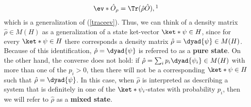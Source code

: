 \documentclass[12pt]{report}
\begin{document}
    \begin{equation}\label{expdensity}\ev*{\hat{O}}_\rho=\Tr(\hat{\rho}\hat{O}),\protect\footnotemark\end{equation}which is a generalization of (\ref{traceev}). Thus, we can think of a density matrix $\hat{\rho}\in M(H)$ as a generalization \label{genket} of a state ket-vector $\ket*{\psi}\in H$, since for every $\ket*{\psi}\in H$ there corresponds a density matrix $\hat{\rho}=\dyad{\psi}\in M(H)$. Because of this identification, $\hat{\rho}=\dyad{\psi}$ is referred to as a \textbf{pure state}. On the other hand, the converse does not hold: if $\hat{\rho}=\sum_i p_i\dyad{\psi_i}\in M(H)$ with more than one of the $p_i> 0$, then there will not be a corresponding $\ket*{\psi}\in H$ such that $\hat{\rho}=\dyad{\psi}$. In this case, when $\hat{\rho}$ is interpreted as describing a system that is definitely in one of the $\ket*{\psi_i}$-states with probability $p_i$, then we will refer to $\hat{\rho}$ as a \textbf{mixed state}.\label{mixedstate}
\end{document}
